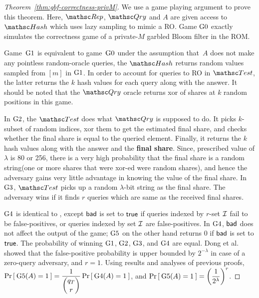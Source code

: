 \begin{proof}[Theorem~\ref{thm:gbf-correctness-privM}]
We use a game playing argument to prove this theorem. Here, $\Rep$, $\Qry$ and $A$ are given access to $\Hash$ which uses lazy sampling to mimic a RO. Game $\text{G0}$ exactly simulates the correctness game of a private-$M$ garbled Bloom filter in the ROM. 

Game~$\text{G1}$ is equivalent to game~$\text{G0}$ under the assumption that~$A$ does not make any pointless random-oracle queries, the $\Hash$ returns random values sampled from $[m]$ in $\text{G1}$. In order to account for queries to RO in $\Test$, the latter returns the $k$ hash values for each query along with the answer. It should be noted that the $\Qry$ oracle returns xor of shares at $k$ random positions in this game. 

In $\text{G2}$, the $\Test$ does what $\Qry$ is supposed to do. It picks $k$-subset of random indices, xor them to get the estimated final share, and checks whether the final share is equal to the queried element. Finally, it returns the $k$ hash values along with the answer and the \textbf{final share}. Since, prescribed value of $\lambda$ is 80 or 256, there is a very high probability that the final share is a random string(one or more shares that were xor-ed were random shares), and hence the adversary gains very little advantage in knowing the value of the final share. In $\text{G3}$, $\Test$ picks up a random $\lambda$-bit string as the final share. The adversary wins if it finds $r$ queries which are same as the received final shares.

$\text{G4}$ is identical to , except $\mathsf{bad}$ is set to $\mathsf{true}$ if queries indexed by $r$-set ${\cal I}$ fail to be false-positives, or queries indexed by set ${\cal I}$ are false-positives. In $\text{G4}$, $\mathsf{bad}$ does not affect the output of the game; $\text{G5}$ on the other hand returns 0 if $\mathsf{bad}$ is set to $\mathsf{true}$. The probability of winning $\text{G1}$, $\text{G2}$, $\text{G3}$, and $\text{G4}$ are equal. Dong et al. \cite{Dong} showed that the false-positive probability is upper bounded by $2^{-\lambda}$ in case of a zero-query adversary, and $r=1$.  Using results and analyses of previous proofs, $\Pr\left[\: \text{G5}(A)=1 \:\right] = \dfrac{1}{\dbinom{q_T}{r}}\Pr\left[\: \text{G4}(A)=1 \:\right]$, and $\Pr\left[\: \text{G5}(A) = 1 \:\right] = \left( \dfrac{1}{2^{\lambda}} \right)^r$.


\end{proof}
